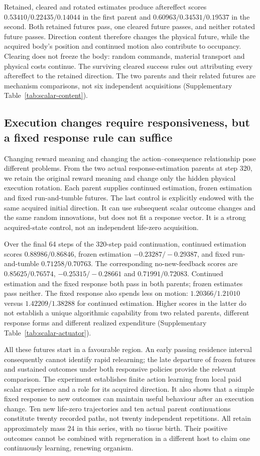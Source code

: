 Retained, cleared and rotated estimates produce aftereffect scores $0.53410/0.22435/0.14044$ in the first parent and $0.60963/0.34531/0.19537$ in the second. Both retained futures pass, one cleared future passes, and neither rotated future passes. Direction content therefore changes the physical future, while the acquired body's position and continued motion also contribute to occupancy. Clearing does not freeze the body: random commands, material transport and physical costs continue. The surviving cleared success rules out attributing every aftereffect to the retained direction. The two parents and their related futures are mechanism comparisons, not six independent acquisitions (Supplementary Table~\ref{tab:scalar-content}).

\subsection*{Execution changes require responsiveness, but a fixed response rule can suffice}

Changing reward meaning and changing the action--consequence relationship pose different problems. From the two actual response-estimation parents at step 320, we retain the original reward meaning and change only the hidden physical execution rotation. Each parent supplies continued estimation, frozen estimation and fixed run-and-tumble futures. The last control is explicitly endowed with the same acquired initial direction. It can use subsequent scalar outcome changes and the same random innovations, but does not fit a response vector. It is a strong acquired-state control, not an independent life-zero acquisition.

Over the final 64 steps of the 320-step paid continuation, continued estimation scores $0.88986/0.86846$, frozen estimation $-0.23287/-0.29387$, and fixed run-and-tumble $0.71258/0.70763$. The corresponding no-new-feedback scores are $0.85625/0.76574$, $-0.25315/-0.28661$ and $0.71991/0.72083$. Continued estimation and the fixed response both pass in both parents; frozen estimates pass neither. The fixed response also spends less on motion: $1.20366/1.21010$ versus $1.42209/1.38288$ for continued estimation. Higher scores in the latter do not establish a unique algorithmic capability from two related parents, different response forms and different realized expenditure (Supplementary Table~\ref{tab:scalar-actuator}).

All these futures start in a favourable region. An early passing residence interval consequently cannot identify rapid relearning; the late departure of frozen futures and sustained outcomes under both responsive policies provide the relevant comparison. The experiment establishes finite action learning from local paid scalar experience and a role for its acquired direction. It also shows that a simple fixed response to new outcomes can maintain useful behaviour after an execution change. Ten new life-zero trajectories and ten actual parent continuations constitute twenty recorded paths, not twenty independent repetitions. All retain approximately mass 24 in this series, with no tissue birth. Their positive outcomes cannot be combined with regeneration in a different host to claim one continuously learning, renewing organism.


